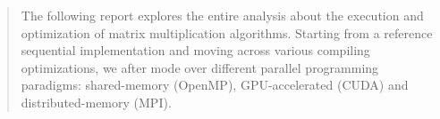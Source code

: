 \begin{abstract}
\noindent
The following report explores the entire analysis about the execution and optimization of matrix multiplication algorithms. Starting from a reference sequential implementation and moving across various compiling optimizations, we after mode over different parallel programming paradigms: shared-memory (OpenMP), GPU-accelerated (CUDA) and distributed-memory (MPI).
\end{abstract} 